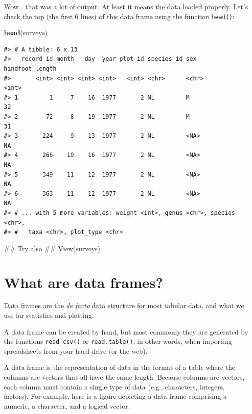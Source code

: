 \documentclass[]{book}
\newenvironment{Shaded}{\begin{snugshade}}{\end{snugshade}}
\newcommand{\KeywordTok}[1]{\textcolor[rgb]{0.13,0.29,0.53}{\textbf{#1}}}
\newcommand{\NormalTok}[1]{#1}
\begin{document}
Wow\ldots{} that was a lot of output. At least it means the data loaded
properly. Let's check the top (the first 6 lines) of this data frame
using the function \texttt{head()}:

\begin{Shaded}
\begin{Highlighting}[]
\KeywordTok{head}\NormalTok{(surveys)}
\end{Highlighting}
\end{Shaded}

\begin{verbatim}
#> # A tibble: 6 x 13
#>   record_id month   day  year plot_id species_id sex   hindfoot_length
#>       <int> <int> <int> <int>   <int> <chr>      <chr>           <int>
#> 1         1     7    16  1977       2 NL         M                  32
#> 2        72     8    19  1977       2 NL         M                  31
#> 3       224     9    13  1977       2 NL         <NA>               NA
#> 4       266    10    16  1977       2 NL         <NA>               NA
#> 5       349    11    12  1977       2 NL         <NA>               NA
#> 6       363    11    12  1977       2 NL         <NA>               NA
#> # ... with 5 more variables: weight <int>, genus <chr>, species <chr>,
#> #   taxa <chr>, plot_type <chr>
\end{verbatim}

\begin{Shaded}
\begin{Highlighting}[]
\NormalTok{## Try also}
\NormalTok{## View(surveys)}
\end{Highlighting}
\end{Shaded}

\section{What are data frames?}\label{what-are-data-frames}

Data frames are the \emph{de facto} data structure for most tabular
data, and what we use for statistics and plotting.

A data frame can be created by hand, but most commonly they are
generated by the functions \texttt{read\_csv()} or
\texttt{read.table()}; in other words, when importing spreadsheets from
your hard drive (or the web).

A data frame is the representation of data in the format of a table
where the columns are vectors that all have the same length. Because
columns are vectors, each column must contain a single type of data
(e.g., characters, integers, factors). For example, here is a figure
depicting a data frame comprising a numeric, a character, and a logical
vector.
\end{document}
